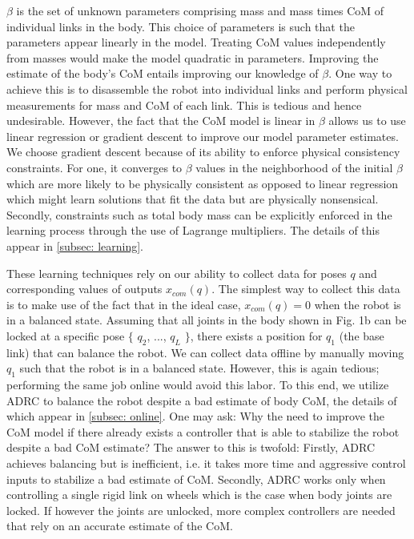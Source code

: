 \documentclass[letterpaper, 10 pt, conference]{ieeeconf}  %
\begin{document}
$\beta$ is the set of unknown parameters comprising mass and mass times \ac{CoM} of individual links in the body. This choice of parameters is such that the parameters appear linearly in the model. Treating \ac{CoM} values independently from masses would make the model quadratic in parameters. Improving the estimate of the body's \ac{CoM} entails improving our knowledge of $\beta$. One way to achieve this is to disassemble the robot into individual links and perform physical measurements for mass and \ac{CoM} of each link. This is tedious and hence undesirable. However, the fact that the \ac{CoM} model is linear in $\beta$ allows us to use linear regression or gradient descent to improve our model parameter estimates. We choose gradient descent because of its ability to enforce physical consistency constraints. For one, it converges to $\beta$ values in the neighborhood of the initial $\beta$ which are more likely to be physically consistent as opposed to linear regression which might learn solutions that fit the data but are physically nonsensical. Secondly, constraints such as total body mass can be explicitly enforced in the learning process through the use of Lagrange multipliers. The details of this appear in \cref{subsec: learning}.

These learning techniques rely on our ability to collect data for poses $q$ and corresponding values of outputs $x_{com}(q)$. The simplest way to collect this data is to make use of the fact that in the ideal case, $x_{com}(q) = 0$ when the robot is in a balanced state. Assuming that all joints in the body  shown in Fig. 1b can be locked at a specific pose $\{$ $q_2$, $...$, $q_L$ $\}$, there exists a position for $q_1$ (the base link) that can balance the robot. We can collect data offline by manually moving $q_1$ such that the robot is in a balanced state. However, this is again tedious; performing the same job online would avoid this labor. To this end, we utilize \ac{ADRC} \cite{canete2012disturbance} to balance the robot despite a bad estimate of body \ac{CoM}, the details of which appear in \cref{subsec: online}. One may ask: Why the need to improve  the \ac{CoM} model if there already exists a controller that is able to stabilize the robot despite a bad \ac{CoM} estimate? The answer to this is twofold: Firstly, \ac{ADRC} achieves balancing but is inefficient, i.e. it takes more time and aggressive control inputs to stabilize a bad estimate of \ac{CoM}. Secondly, \ac{ADRC} works only when controlling a single rigid link on wheels which is the case when body joints are locked. If however the joints are unlocked, more complex controllers are needed that rely on an accurate estimate of the \ac{CoM}.
\end{document}
